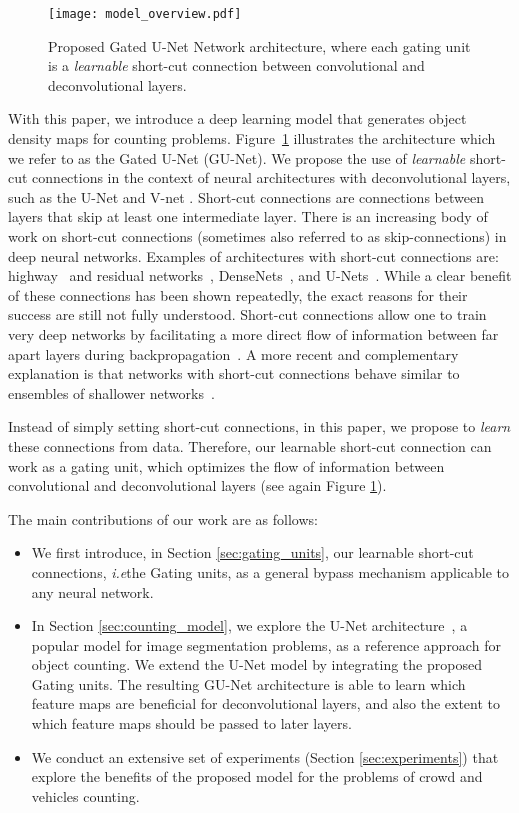 \documentclass{bmvc2k}
\def\ie{\emph{i.e}\bmvaOneDot}
\begin{document}
\begin{figure}
\centering
\texttt{[image: model\_overview.pdf]}
\caption{\label{fig:gated-architecture} Proposed Gated U-Net Network architecture, where each gating unit is a \emph{learnable} short-cut connection between convolutional and deconvolutional layers.}
\end{figure}

With this paper, we introduce a deep learning model that generates object density maps for counting problems. Figure~\ref{fig:gated-architecture} illustrates the architecture which we refer to as the Gated U-Net (GU-Net). We propose the use of \emph{learnable} short-cut connections in the context of neural architectures with deconvolutional layers, such as the U-Net \cite{unetRonnebergerFB15} and V-net \cite{MilletariNA16}. Short-cut connections are connections between layers that skip at least one intermediate layer. There is an increasing body of work on short-cut connections (sometimes also referred to as skip-connections) in deep neural networks. Examples of architectures with short-cut connections are: highway~\cite{Srivastava_2015_NIPS} and residual networks~\cite{he2016deep}, DenseNets~\cite{Huang_2017_CVPR}, and U-Nets~\cite{unetRonnebergerFB15}. While a clear benefit of these connections has been shown repeatedly, the exact reasons for their success are still not fully understood. Short-cut connections allow one to train very deep networks by facilitating a more direct flow of information between far apart layers during backpropagation~\cite{he2016deep}. A more recent and complementary explanation is that networks with short-cut connections behave similar to ensembles of shallower networks~\cite{veit16residual}.


Instead of simply setting short-cut connections, in this paper, we propose to \emph{learn} these connections from data. Therefore, our learnable short-cut connection can work as a gating unit, which optimizes the flow of information between convolutional and deconvolutional layers (see again Figure \ref{fig:gated-architecture}).


The main contributions of our work are as follows:
\begin{itemize}
 \item We first introduce, in Section \ref{sec:gating_units}, our learnable short-cut connections, \ie the Gating units, as a general bypass mechanism applicable to any neural network. 
 \item In Section \ref{sec:counting_model}, we explore the U-Net architecture~\cite{unetRonnebergerFB15}, a popular model for image segmentation problems, as a reference approach for object counting. We extend the U-Net model by integrating the proposed Gating units. The resulting GU-Net architecture is able to learn which feature maps are beneficial for deconvolutional layers, and also the extent to which feature maps should be passed to later layers.
 \item We conduct an extensive set of experiments (Section \ref{sec:experiments}) that explore the benefits of the proposed model for the problems of crowd and vehicles counting.
\end{itemize}
\end{document}
